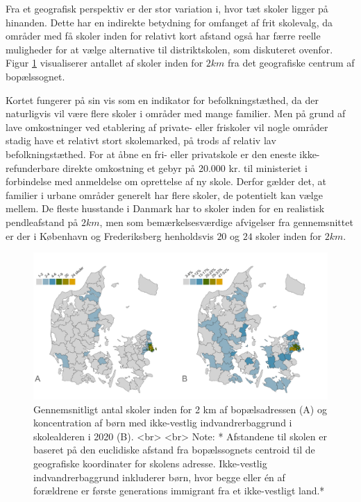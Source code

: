 \documentclass[
]{book}
\begin{document}
Fra et geografisk perspektiv er der stor variation i, hvor tæt skoler ligger på hinanden. Dette har en indirekte betydning for omfanget af frit skolevalg, da områder med få skoler inden for relativt kort afstand også har færre reelle muligheder for at vælge alternative til distriktskolen, som diskuteret ovenfor. Figur \ref{fig:fig-3-1} visualiserer antallet af skoler inden for \(2 km\) fra det geografiske centrum af bopælssognet.

Kortet fungerer på sin vis som en indikator for befolkningstæthed, da der naturligvis vil være flere skoler i områder med mange familier. Men på grund af lave omkostninger ved etablering af private- eller friskoler vil nogle områder stadig have et relativt stort skolemarked, på trods af relativ lav befolkningstæthed. For at åbne en fri- eller privatskole er den eneste ikke-refunderbare direkte omkostning et gebyr på 20.000 kr. til ministeriet i forbindelse med anmeldelse om oprettelse af ny skole. Derfor gælder det, at familier i urbane områder generelt har flere skoler, de potentielt kan vælge mellem. De fleste husstande i Danmark har to skoler inden for en realistisk pendleafstand på \(2 km\), men som bemærkelsesværdige afvigelser fra gennemsnittet er der i København og Frederiksberg henholdsvis \(20\) og \(24\) skoler inden for \(2 km\).

\begin{figure}
\includegraphics[width=1\linewidth]{images/figur_3_1c_distance_antal} \caption{Gennemsnitligt antal skoler inden for 2 km af bopælsadressen (A) og koncentration af børn med ikke-vestlig indvandrerbaggrund i skolealderen i 2020 (B). <br> <br> Note: * Afstandene til skolen er baseret på den euclidiske afstand fra bopælssognets centroid til de geografiske koordinater for skolens adresse. Ikke-vestlig indvandrerbaggrund inkluderer børn, hvor begge eller én af forældrene er første generations immigrant fra et ikke-vestligt land.*}\label{fig:fig-3-1}
\end{figure}
\end{document}
